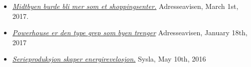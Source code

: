 \documentclass[margin]{res}
\begin{document}
\begin{resume}
\begin{itemize}
\item[] \href{http://www.adressa.no/meninger/ordetfritt/2017/03/01/Midtbyen-burde-bli-mer-som-et-shoppingsenter-14344490.ece?cx_Deling=AddThis}{\emph{Midtbyen burde bli mer som et shoppingsenter.}} Adresseavisen, March 1st, 2017.

\item[] \href{http://www.e-pages.dk/adresseavisen/5350/article/525164/33/6/render/?token=d6dbc5eb6e27835a4e2c9e1c460302d6}{\emph{Powerhouse er den type grep som byen trenger}} Adresseavisen, January 18th, 2017

\item[] \href{http://syslagronn.no/2016/05/12/syslagronn/serieproduksjon-skaper-energirevolusjon_87844/.VzQ1IfhgWKc.twitter}{\emph{Serieproduksjon skaper energirevelosjon.}} Sysla, May 10th, 2016


\end{itemize}
\end{resume}
\end{document}
